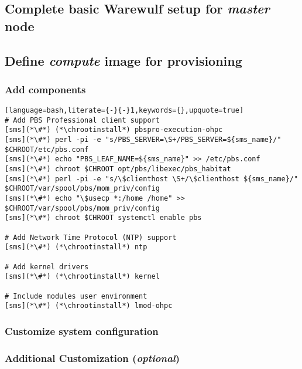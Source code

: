 \documentclass[letterpaper]{article}
\newcommand{\chrootinstall}{yum -y --installroot=\$CHROOT install}
\begin{document}
\vspace*{-0.15cm}
\subsection{Complete basic Warewulf setup for {\em master} node} \label{sec:setup_ww}



\subsection{Define {\em compute} image for provisioning}


\subsubsection{Add \OHPC{} components} \label{sec:add_components}


\begin{lstlisting}[language=bash,literate={-}{-}1,keywords={},upquote=true]
# Add PBS Professional client support
[sms](*\#*) (*\chrootinstall*) pbspro-execution-ohpc
[sms](*\#*) perl -pi -e "s/PBS_SERVER=\S+/PBS_SERVER=${sms_name}/" $CHROOT/etc/pbs.conf
[sms](*\#*) echo "PBS_LEAF_NAME=${sms_name}" >> /etc/pbs.conf
[sms](*\#*) chroot $CHROOT opt/pbs/libexec/pbs_habitat
[sms](*\#*) perl -pi -e "s/\$clienthost \S+/\$clienthost ${sms_name}/" $CHROOT/var/spool/pbs/mom_priv/config
[sms](*\#*) echo "\$usecp *:/home /home" >> $CHROOT/var/spool/pbs/mom_priv/config
[sms](*\#*) chroot $CHROOT systemctl enable pbs

# Add Network Time Protocol (NTP) support
[sms](*\#*) (*\chrootinstall*) ntp

# Add kernel drivers
[sms](*\#*) (*\chrootinstall*) kernel

# Include modules user environment
[sms](*\#*) (*\chrootinstall*) lmod-ohpc
\end{lstlisting}

\subsubsection{Customize system configuration} \label{sec:master_customization}


\subsubsection{Additional Customization ({\em optional})} \label{sec:addl_customizations}

\end{document}
